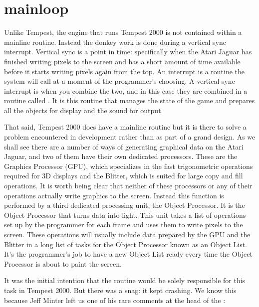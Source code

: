 \chapter{mainloop} 
\label{sec:listing}
\lstset{style=68KStyle}
\lhead[tempest 2000]{}

Unlike Tempest, the engine that runs Tempest 2000 is not contained within a mainline routine. Instead
the donkey work is done during a vertical sync interrupt. Vertical sync is a point in time: specifically
when the Atari Jaguar has finished writing pixels to the screen and has a short amount of time available
before it starts writing pixels again from the top. An interrupt is a routine the system will call at a moment
of the programmer's choosing. A vertical sync interrupt is when you combine the two, and in this case they 
are combined in a routine called . It is this routine that manages the state of the game and prepares
all the objects for display and the sound for output.

That said, Tempest 2000 does have a mainline routine but it is there to solve a problem encountered in development
rather than as part of a grand design. As we shall see there are a number of ways of generating graphical data on the Atari
Jaguar, and two of them have their own dedicated processors. These are the Graphics Processor (GPU), which specializes
in the fast trigonometric operations required for 3D displays and the Blitter, which is suited for large copy and fill operations.
It is worth being clear that neither of these processors or any of their operations actually write graphics to the screen.
Instead this function is performed by a third dedicated processing unit, the Object Processor. It is the Object Processor 
that turns data into light. This unit takes a list of operations set up by the programmer for each frame and uses them to write
pixels to the screen. These operations will usually include data prepared by the GPU and the Blitter in a long list of tasks
for the Object Processor known as an Object List. It's the programmer's job to have a new Object List ready every time
the Object Processor is about to paint the screen. 

It was the initial intention that the  routine would be solely responsible for this task in Tempest 2000. 
But there was a snag: it kept crashing. We know this because Jeff Minter left us one of his rare comments at the head
of the :

